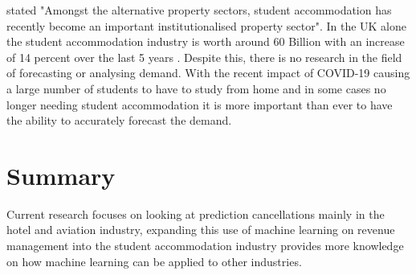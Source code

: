 \vspace{5mm}

\cite{Newell2018TheSector} stated "Amongst the alternative property sectors, student accommodation has recently become an important institutionalised property sector". In the UK alone the student accommodation industry is worth around 60 Billion \cite{UKWakefield} with an increase of 14 percent over the last 5 years \cite{UKWakefield}. Despite this, there is no research in the field of forecasting or analysing demand. With the recent impact of COVID-19 causing a large number of students to have to study from home and in some cases no longer needing student accommodation it is more important than ever to have the ability to accurately forecast the demand. 

\section{Summary}

Current research focuses on looking at prediction cancellations mainly in the hotel and aviation industry, expanding this use of machine learning on revenue management into the student accommodation industry provides more knowledge on how machine learning can be applied to other industries. 


